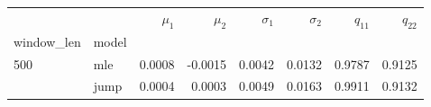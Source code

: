 \begin{tabular}{llrrrrrr}
\toprule
    &      &  $\mu_1$ &  $\mu_2$ &  $\sigma_1$ &  $\sigma_2$ &  $q_{11}$ &  $q_{22}$ \\
window_len & model &          &          &             &             &           &           \\
\midrule
500 & mle &   0.0008 &  -0.0015 &      0.0042 &      0.0132 &    0.9787 &    0.9125 \\
    & jump &   0.0004 &   0.0003 &      0.0049 &      0.0163 &    0.9911 &    0.9132 \\
\bottomrule
\end{tabular}
